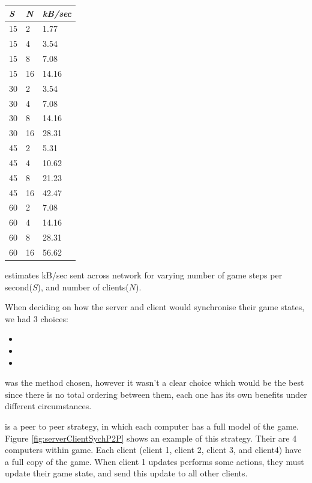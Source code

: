 \begin{margintable}
    \begin{tabular}{p{5em} p{5em} p{5em}}
    \toprule
    \emph{S} & \emph{N} & \emph{kB/sec} \\
    \midrule
    15 & 2 & 1.77 \\
    15 & 4 & 3.54 \\
    15 & 8 & 7.08 \\
    15 & 16 & 14.16 \\
    30 & 2 & 3.54 \\
    30 & 4 & 7.08 \\
    30 & 8 & 14.16 \\
    30 & 16 & 28.31 \\
    45 & 2 & 5.31 \\
    45 & 4 & 10.62 \\
    45 & 8 & 21.23 \\
    45 & 16 & 42.47 \\
    60 & 2 & 7.08 \\
    60 & 4 & 14.16 \\
    60 & 8 & 28.31 \\
    60 & 16 & 56.62 \\
    \bottomrule
    \end{tabular}
    	\vspace{1em}
	\caption{estimates kB/sec sent across network for varying number of game steps per second($S$), and number of clients($N$).}
	\label{tab:networkRequirements}
\end{margintable}


When deciding on how the server and client would synchronise their game states, we had 3 choices:
\begin{itemize}
\item \stepOneName
\item \stepTwoName
\item \stepThreeName
\end{itemize}

\stepTwoName was the method chosen, however it wasn't a clear choice which would be the best since there is no total ordering between them, each one has its own benefits under different circumstances.

\emph{\stepOneName} is a peer to peer strategy, in which each computer has a full model of the game. Figure \ref{fig:serverClientSychP2P} shows an example of this strategy. 
Their are 4 computers within game. Each client (client 1, client 2, client 3, and client4) have a full copy of the game.
When client 1 updates performs some actions, they must update their game state, and send this update to all other clients.

